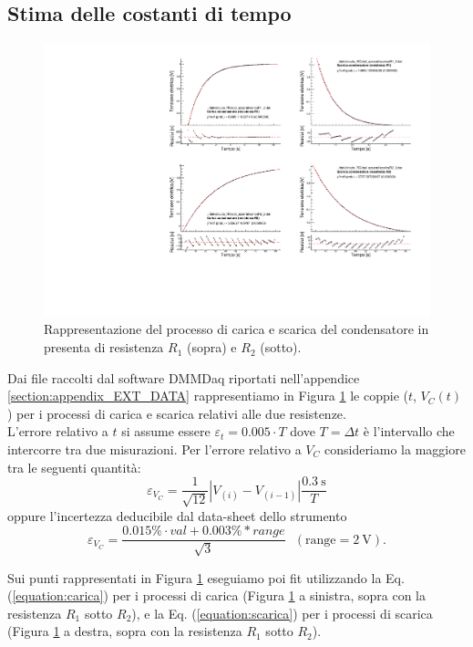 \documentclass[
    reprint, 
    superscriptaddress, 
    altaffilletter, 
    amsmath, 
    amssymb, 
    a4paper
]{revtex4-2}
\newcommand{\reffig}[1]{Figura {\ref{#1}}}%
\newcommand{\refeqn}[1]{Eq. ({\ref{#1}})}%
\newcommand{\mstdErr}[1]{\varepsilon_{#1}}
\begin{document}
    



    \subsection{Stima delle costanti di tempo}

    \begin{figure}[t!]
        \centering
        \includegraphics[width=\linewidth]{plot_RC.pdf}
        \caption{Rappresentazione del processo di carica e scarica del condensatore in presenta di resistenza $R_1$ (sopra) e $R_2$ (sotto). }
        \label{figure:plot_RC}
    \end{figure}

    Dai file raccolti dal software DMMDaq riportati nell'appendice \ref{section:appendix_EXT_DATA} rappresentiamo in \reffig{figure:plot_RC} le coppie ($t$, $V_C(t)$) per i processi di carica e scarica relativi alle due resistenze. \\
    L'errore relativo a $t$ si assume essere $\mstdErr{t}=0.005\cdot T$ dove $T=\Delta t$ è l'intervallo che intercorre tra due misurazioni. Per l'errore relativo a $V_C$ consideriamo la maggiore tra le seguenti quantità: 
    \[
        \mstdErr{V_C} = \frac{1}{\sqrt{12}}\left|V_{(i)}-V_{(i-1)}\right|\frac{0.3~\text{s}}{T}  
    \]oppure l'incertezza deducibile dal data-sheet dello strumento
    \[
        \mstdErr{V_C}=\frac{0.015\% \cdot val + 0.003\% * range}{\sqrt{3}}~~~(\text{range}=2~\text{V}).
    \]

    Sui punti rappresentati in \reffig{figure:plot_RC} eseguiamo poi fit utilizzando la \refeqn{equation:carica} per i processi di carica (\reffig{figure:plot_RC} a sinistra, sopra con la resistenza $R_1$ sotto $R_2$), e la \refeqn{equation:scarica} per i processi di scarica (\reffig{figure:plot_RC} a destra, sopra con la resistenza $R_1$ sotto $R_2$).
\end{document}
